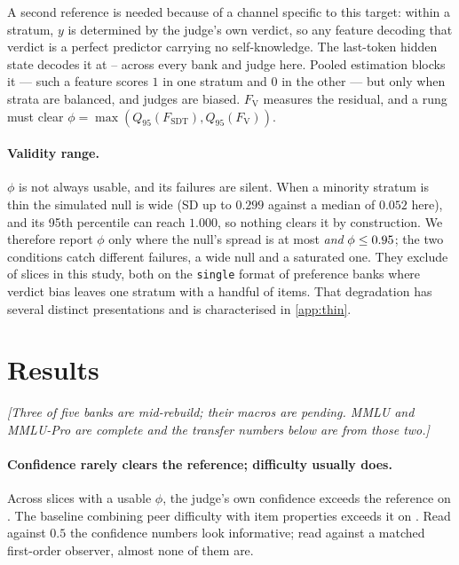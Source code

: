 \documentclass{article}
\begin{document}
A second reference is needed because of a channel specific to this target: within a stratum, $y$ is
determined by the judge's own verdict, so any feature decoding that verdict is a perfect predictor
carrying no self-knowledge. The last-token hidden state decodes it at \VerdictDecodLo{}--%
\VerdictDecodHi{} across every bank and judge here. Pooled estimation blocks it --- such a feature
scores $1$ in one stratum and $0$ in the other --- but only when strata are balanced, and judges are
biased. $F_{\mathrm{V}}$ measures the residual, and a rung must clear
$\phi = \max(Q_{95}(F_{\mathrm{SDT}}), Q_{95}(F_{\mathrm{V}}))$.

\paragraph{Validity range.} $\phi$ is not always usable, and its failures are silent. When a
minority stratum is thin the simulated null is wide (SD up to $0.299$ against a median of $0.052$
here), and its 95th percentile can reach $1.000$, so nothing clears it by construction. We therefore
report $\phi$ only where the null's spread is at most \FloorSdMax{} \emph{and} $\phi \le
0.95{}$; the two conditions catch different failures, a wide null and a saturated one. They
exclude \NSlicesExcluded{} of \NSlicesTotal{} slices in this study, both on the \texttt{single}
format of preference banks where verdict bias leaves one stratum with a handful of items. That
degradation has several distinct presentations and is characterised in \cref{app:thin}.

\section{Results}
\label{sec:results}

\emph{[Three of five banks are mid-rebuild; their macros are pending. MMLU and MMLU-Pro are
complete and the transfer numbers below are from those two.]}

\paragraph{Confidence rarely clears the reference; difficulty usually does.} Across
\NSlicesUsable{} slices with a usable $\phi$, the judge's own confidence exceeds the reference on
\NClearConfidence{}. The baseline combining peer difficulty with item properties exceeds it on
\NClearBaseline{}. Read against $0.5$ the confidence numbers look informative; read against a
matched first-order observer, almost none of them are.
\end{document}
